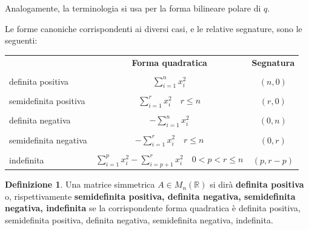 \documentclass{article}
\theoremstyle{plain}
\theoremstyle{definition}
\newtheorem{defn}{Definizione}[section]
\theoremstyle{remark}
\begin{document}
\vspace{10pt}

Analogamente, la terminologia si usa per la forma bilineare polare di $q$.

\vspace{10pt}

Le forme canoniche corrispondenti ai diversi casi, e le relative segnature, sono le seguenti:

\vspace{10pt}

\begin{center}
\begin{tabular}{lcc}
& \textbf{Forma quadratica} & \textbf{Segnatura} \\\\

definita positiva & $\sum_{i=1}^{n}x_i^2$ & $(n, 0)$ \\\\

semidefinita positiva & $\sum_{i=1}^{r}x_i^2\quad r \leq n$ & $(r, 0)$ \\\\

definita negativa & $-\sum_{i=1}^{n}x_i^2$ & $(0, n)$ \\\\

semidefinita negativa & $-\sum_{i=1}^{r}x_i^2\quad r \leq n$ & $(0, r)$ \\\\

indefinita & $\sum_{i=1}^{p}x_i^2  - \sum_{i=p+1}^{r}x_i^2\quad 0 < p < r \leq n$ & $(p, r - p)$ \\
\end{tabular}
\end{center}

\vspace{10pt}

\begin{bxthm}
\begin{defn}
Una matrice simmetrica $A \in M_n(\mathbb{R})$ si dirà \textbf{definita positiva} o, rispettivamente \textbf{semidefinita positiva, definita negativa, semidefinita negativa, indefinita} se 
la corrispondente forma quadratica è definita positiva, semidefinita positiva, definita negativa, semidefinita negativa, indefinita.
\end{defn}
\end{bxthm}

\vspace{10pt}
\end{document}
